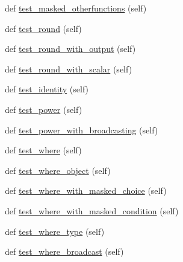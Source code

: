 \begin{DoxyCompactItemize}
\item 
def \hyperlink{classnumpy_1_1ma_1_1tests_1_1test__core_1_1TestMaskedArrayFunctions_a2b432f2af0eec95cb446ab891a327657}{test\+\_\+masked\+\_\+otherfunctions} (self)
\item 
def \hyperlink{classnumpy_1_1ma_1_1tests_1_1test__core_1_1TestMaskedArrayFunctions_a816d603f8c42ef8e50df2b8860bf51b6}{test\+\_\+round} (self)
\item 
def \hyperlink{classnumpy_1_1ma_1_1tests_1_1test__core_1_1TestMaskedArrayFunctions_a9756ef338c37cd2f9f30d34d66e25753}{test\+\_\+round\+\_\+with\+\_\+output} (self)
\item 
def \hyperlink{classnumpy_1_1ma_1_1tests_1_1test__core_1_1TestMaskedArrayFunctions_a0010c9e3654ff2dd4988bc011018a049}{test\+\_\+round\+\_\+with\+\_\+scalar} (self)
\item 
def \hyperlink{classnumpy_1_1ma_1_1tests_1_1test__core_1_1TestMaskedArrayFunctions_a707ac5cc5572ac5a388ea95adcf29d28}{test\+\_\+identity} (self)
\item 
def \hyperlink{classnumpy_1_1ma_1_1tests_1_1test__core_1_1TestMaskedArrayFunctions_a4d87b01f55fa10ebb8c322cace9b6625}{test\+\_\+power} (self)
\item 
def \hyperlink{classnumpy_1_1ma_1_1tests_1_1test__core_1_1TestMaskedArrayFunctions_ad94255a1cebe66238a1ae31711dc2855}{test\+\_\+power\+\_\+with\+\_\+broadcasting} (self)
\item 
def \hyperlink{classnumpy_1_1ma_1_1tests_1_1test__core_1_1TestMaskedArrayFunctions_aa56e545c3817687f2f0208daa746f9d9}{test\+\_\+where} (self)
\item 
def \hyperlink{classnumpy_1_1ma_1_1tests_1_1test__core_1_1TestMaskedArrayFunctions_a42b3dcb6919bcec2b74e1a26084701da}{test\+\_\+where\+\_\+object} (self)
\item 
def \hyperlink{classnumpy_1_1ma_1_1tests_1_1test__core_1_1TestMaskedArrayFunctions_a622fe91ea33123441346acab03a91b7e}{test\+\_\+where\+\_\+with\+\_\+masked\+\_\+choice} (self)
\item 
def \hyperlink{classnumpy_1_1ma_1_1tests_1_1test__core_1_1TestMaskedArrayFunctions_a3c1095aedff780562ed46d67c5b8c68e}{test\+\_\+where\+\_\+with\+\_\+masked\+\_\+condition} (self)
\item 
def \hyperlink{classnumpy_1_1ma_1_1tests_1_1test__core_1_1TestMaskedArrayFunctions_afa6d2c9505a18799949a4fff33f543a2}{test\+\_\+where\+\_\+type} (self)
\item 
def \hyperlink{classnumpy_1_1ma_1_1tests_1_1test__core_1_1TestMaskedArrayFunctions_a2e29549b889a56aa28eb0a94dca8dce6}{test\+\_\+where\+\_\+broadcast} (self)

\end{DoxyCompactItemize}
